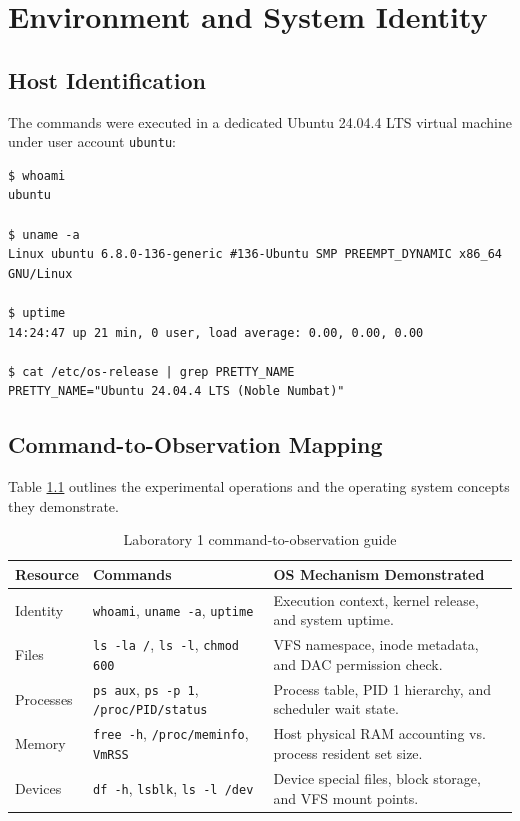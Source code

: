 \documentclass{assets/utmreport}
\begin{document}
\chapter{Environment and System Identity}

\section{Host Identification}
The commands were executed in a dedicated Ubuntu 24.04.4 LTS virtual machine under user account \texttt{ubuntu}:

\begin{verbatim}
$ whoami
ubuntu

$ uname -a
Linux ubuntu 6.8.0-136-generic #136-Ubuntu SMP PREEMPT_DYNAMIC x86_64 GNU/Linux

$ uptime
14:24:47 up 21 min, 0 user, load average: 0.00, 0.00, 0.00

$ cat /etc/os-release | grep PRETTY_NAME
PRETTY_NAME="Ubuntu 24.04.4 LTS (Noble Numbat)"
\end{verbatim}

\section{Command-to-Observation Mapping}
Table \ref{tab:l1_obs} outlines the experimental operations and the operating system concepts they demonstrate.

\begin{table}[H]
\caption{Laboratory 1 command-to-observation guide}
\label{tab:l1_obs}
\centering
\small
\begin{tabularx}{\textwidth}{|l|p{4.2cm}|X|}
\hline
\textbf{Resource} & \textbf{Commands} & \textbf{OS Mechanism Demonstrated} \\
\hline
Identity & \texttt{whoami}, \texttt{uname -a}, \texttt{uptime} & Execution context, kernel release, and system uptime. \\
\hline
Files & \texttt{ls -la /}, \texttt{ls -l}, \texttt{chmod 600} & VFS namespace, inode metadata, and DAC permission check. \\
\hline
Processes & \texttt{ps aux}, \texttt{ps -p 1}, \texttt{/proc/PID/status} & Process table, PID 1 hierarchy, and scheduler wait state. \\
\hline
Memory & \texttt{free -h}, \texttt{/proc/meminfo}, \texttt{VmRSS} & Host physical RAM accounting vs. process resident set size. \\
\hline
Devices & \texttt{df -h}, \texttt{lsblk}, \texttt{ls -l /dev} & Device special files, block storage, and VFS mount points. \\
\hline
\end{tabularx}
\end{table}
\end{document}
